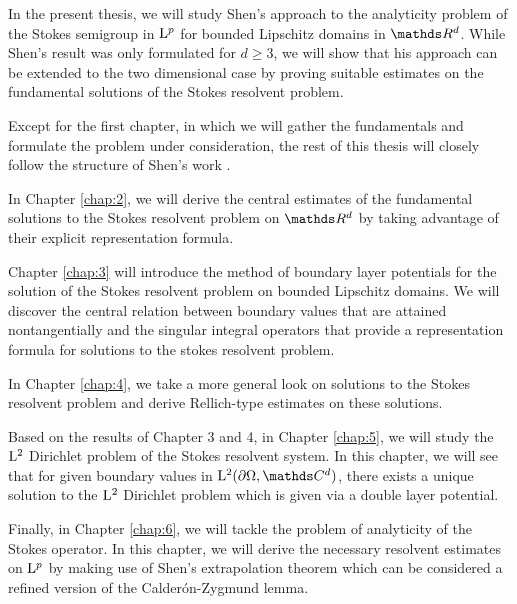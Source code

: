 In the present thesis, we will study Shen's approach to the analyticity problem of the Stokes semigroup in $\mathrm{L}^p$ for bounded Lipschitz domains in $\R^d$.
While Shen's result was only formulated for $d \geq 3$, we will show that his approach can be extended to the two dimensional case by proving suitable estimates on the fundamental solutions of the Stokes resolvent problem.

Except for the first chapter, in which we will gather the fundamentals and formulate the problem under consideration, the rest of this thesis will closely follow the structure of Shen's work \cite{Shen2012}. 

In Chapter \ref{chap:2}, we will derive the central estimates of the fundamental solutions to the Stokes resolvent problem on $\R^d$ by taking advantage of their explicit representation formula.

Chapter \ref{chap:3} will introduce the method of boundary layer potentials for the solution of the Stokes resolvent problem on bounded Lipschitz domains.
We will discover the central relation between boundary values that are attained nontangentially and the singular integral operators that provide a representation formula for solutions to the stokes resolvent problem. 

In Chapter \ref{chap:4}, we take a more general look on solutions to the Stokes resolvent problem and derive Rellich-type estimates on these solutions.

Based on the results of Chapter 3 and 4, in Chapter \ref{chap:5}, we will study the $\mathrm{L}^2$ Dirichlet problem of the Stokes resolvent system. In this chapter, we will see that for given boundary values in $\Ell^2(\partial\Omega, \C^d)$, there exists a unique solution to the $\mathrm{L}^2$ Dirichlet problem which is given via a double layer potential.

Finally, in Chapter \ref{chap:6}, we will tackle the problem of analyticity of the Stokes operator. In this chapter, we will derive the necessary resolvent estimates on $\mathrm{L}^p$ by making use of Shen's extrapolation theorem which can be considered a refined version of the Calder\'on-Zygmund lemma.




